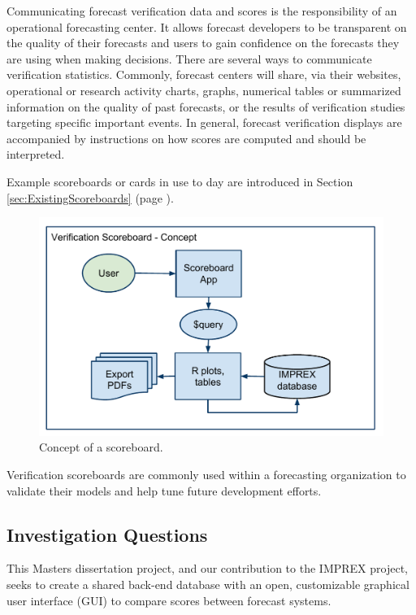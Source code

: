 \documentclass[logos,parttoc,morelanguage=french,morelanguage=german,draft]{orsay-memoire}
\begin{document}
Communicating forecast verification data and scores is the responsibility of an operational forecasting center. It allows forecast developers to be transparent on the quality of their forecasts and users to gain confidence on the forecasts they are using when making decisions. There are several ways to communicate verification statistics. Commonly, forecast centers will share, via their websites, operational or research activity charts, graphs, numerical tables or summarized information on the quality of past forecasts, or the results of verification studies targeting specific important events. In general, forecast verification displays are accompanied by instructions on how scores are computed and should be interpreted.

Example scoreboards or cards in use to day are introduced in Section \ref{sec:ExistingScoreboards} (page \pageref{sec:ExistingScoreboards}).

\begin{figure}[ht]
\centering
\includegraphics[width=0.85\linewidth]{images/IMPREX_Schema.pdf}
  \caption{Concept of a scoreboard.}
  \label{fig:scoreboard concept}
\end{figure}

Verification scoreboards are commonly used within a forecasting organization to validate their models and help tune future development efforts. 

\subsection{Investigation Questions}

This Masters dissertation project, and our contribution to the IMPREX project, seeks to create a shared back-end database with an open, customizable graphical user interface (GUI) to compare scores between forecast systems.
\end{document}

